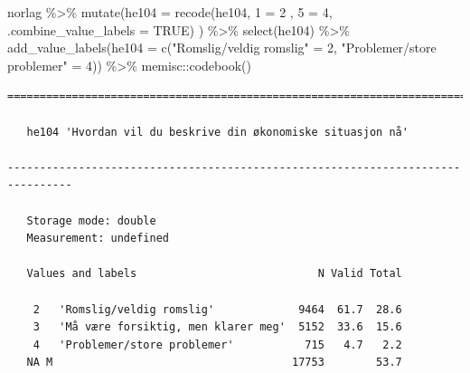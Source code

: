 \documentclass[
  letterpaper,
  DIV=11,
  numbers=noendperiod]{scrreprt}
\newenvironment{Shaded}{\begin{snugshade}}{\end{snugshade}}
\newcommand{\AttributeTok}[1]{\textcolor[rgb]{0.40,0.45,0.13}{#1}}
\newcommand{\ConstantTok}[1]{\textcolor[rgb]{0.56,0.35,0.01}{#1}}
\newcommand{\DecValTok}[1]{\textcolor[rgb]{0.68,0.00,0.00}{#1}}
\newcommand{\FunctionTok}[1]{\textcolor[rgb]{0.28,0.35,0.67}{#1}}
\newcommand{\NormalTok}[1]{\textcolor[rgb]{0.00,0.23,0.31}{#1}}
\newcommand{\OtherTok}[1]{\textcolor[rgb]{0.00,0.23,0.31}{#1}}
\newcommand{\SpecialCharTok}[1]{\textcolor[rgb]{0.37,0.37,0.37}{#1}}
\newcommand{\StringTok}[1]{\textcolor[rgb]{0.13,0.47,0.30}{#1}}
\begin{document}
\begin{Shaded}
\begin{Highlighting}[]
\NormalTok{norlag }\SpecialCharTok{\%\textgreater{}\%} 
  \FunctionTok{mutate}\NormalTok{(}\AttributeTok{he104 =} \FunctionTok{recode}\NormalTok{(he104, }
                          \StringTok{\textasciigrave{}}\AttributeTok{1}\StringTok{\textasciigrave{}} \OtherTok{=} \DecValTok{2}\NormalTok{ ,}
                          \StringTok{\textasciigrave{}}\AttributeTok{5}\StringTok{\textasciigrave{}} \OtherTok{=} \DecValTok{4}\NormalTok{,}
                        \AttributeTok{.combine\_value\_labels =} \ConstantTok{TRUE}\NormalTok{) ) }\SpecialCharTok{\%\textgreater{}\%} 
  \FunctionTok{select}\NormalTok{(he104) }\SpecialCharTok{\%\textgreater{}\%} 
  \FunctionTok{add\_value\_labels}\NormalTok{(}\AttributeTok{he104 =} \FunctionTok{c}\NormalTok{(}\StringTok{"Romslig/veldig romslig"} \OtherTok{=} \DecValTok{2}\NormalTok{, }
                             \StringTok{"Problemer/store problemer"} \OtherTok{=} \DecValTok{4}\NormalTok{)) }\SpecialCharTok{\%\textgreater{}\%} 
\NormalTok{  memisc}\SpecialCharTok{::}\FunctionTok{codebook}\NormalTok{()}
\end{Highlighting}
\end{Shaded}

\begin{verbatim}
================================================================================

   he104 'Hvordan vil du beskrive din økonomiske situasjon nå'

--------------------------------------------------------------------------------

   Storage mode: double
   Measurement: undefined

   Values and labels                            N Valid Total
                                                             
    2   'Romslig/veldig romslig'             9464  61.7  28.6
    3   'Må være forsiktig, men klarer meg'  5152  33.6  15.6
    4   'Problemer/store problemer'           715   4.7   2.2
   NA M                                     17753        53.7
\end{verbatim}
\end{document}
